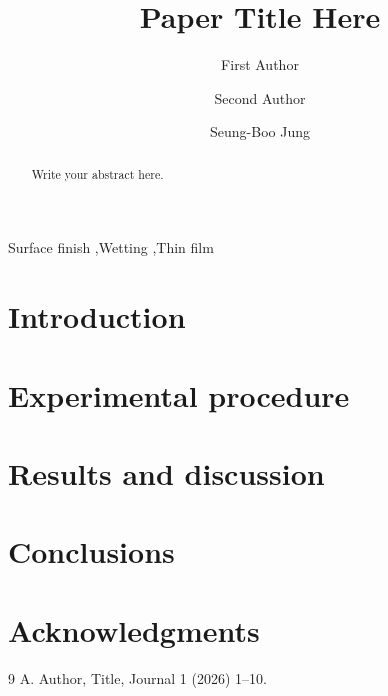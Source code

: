 \documentclass[review]{elsarticle}
\begin{document}
\begin{frontmatter}

\title{Paper Title Here}

\author[skku]{First Author}
\author[skku]{Second Author}
\author[skku]{Seung-Boo Jung}

\begin{abstract}
Write your abstract here.
\end{abstract}

\begin{keyword}
Surface finish \sep Wetting \sep Thin film
\end{keyword}

\end{frontmatter}

\section{Introduction}

\section{Experimental procedure}

\section{Results and discussion}

\section{Conclusions}

\section*{Acknowledgments}

\begin{thebibliography}{9}
 A. Author, Title, Journal 1 (2026) 1--10.
\end{thebibliography}
\end{document}
